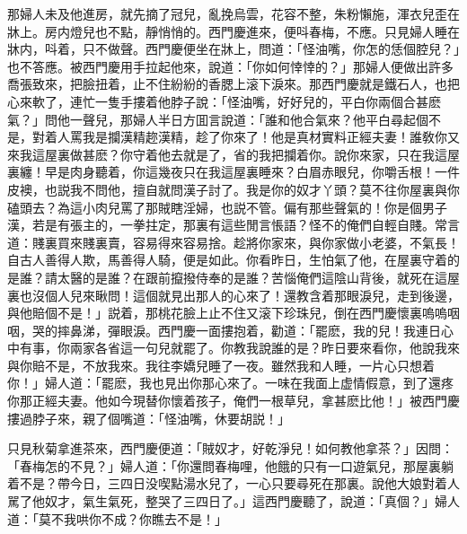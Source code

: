 那婦人未及他進房，就先摘了冠兒，亂挽烏雲，花容不整，朱粉懶施，渾衣兒歪在牀上。房内燈兒也不點，靜悄悄的。西門慶進來，便呌春梅，不應。只見婦人睡在牀内，呌着，只不做聲。西門慶便坐在牀上，問道：「怪油嘴，你怎的恁個腔兒？」也不答應。被西門慶用手拉起他來，說道：「你如何悻悻的？」那婦人便做出許多喬張致來，把臉扭着，止不住紛紛的香腮上滚下淚來。那西門慶就是鐵石人，也把心來軟了，連忙一隻手摟着他脖子說：「怪油嘴，好好兒的，平白你兩個合甚麽氣？」問他一聲兒，那婦人半日方囬言說道：「誰和他合氣來？他平白尋起個不是，對着人罵我是攔漢精趂漢精，趁了你來了！他是真材實料正經夫妻！誰敎你又來我這屋裏做甚麽？你守着他去就是了，省的我把攔着你。說你來家，只在我這屋裏纏！早是肉身聽着，你這幾夜只在我這屋裏睡來？白眉赤眼兒，你嚼舌根！一件皮襖，也説我不問他，擅自就問漢子討了。我是你的奴才丫頭？莫不往你屋裏與你磕頭去？為這小肉兒罵了那賊瞎淫婦，也説不管。偏有那些聲氣的！你是個男子漢，若是有張主的，一拳拄定，那裏有這些閒言悵語？怪不的俺們自輕自賤。常言道：賤裏買來賤裏賣，容易得來容易捨。趁將你家來，與你家做小老婆，不氣長！自古人善得人欺，馬善得人騎，便是如此。你看昨日，生怕氣了他，在屋裏守着的是誰？請太醫的是誰？在跟前攛撥侍奉的是誰？苦惱俺們這陰山背後，就死在這屋裏也沒個人兒來瞅問！這個就見出那人的心來了！還教含着那眼淚兒，走到後邊，與他賠個不是！」説着，那桃花臉上止不住又滚下珍珠兒，倒在西門慶懷裏嗚嗚咽咽，哭的摔鼻涕，彈眼淚。西門慶一面摟抱着，勸道：「罷麽，我的兒！我連日心中有事，你兩家各省這一句兒就罷了。你教我說誰的是？昨日要來看你，他說我來與你賠不是，不放我來。我往李嬌兒睡了一夜。雖然我和人睡，一片心只想着你！」婦人道：「罷麽，我也見出你那心來了。一味在我面上虚情假意，到了還疼你那正經夫妻。他如今現替你懷着孩子，俺們一根草兒，拿甚麽比他！」被西門慶摟過脖子來，親了個嘴道：「怪油嘴，休要胡説！」

只見秋菊拿進茶來，西門慶便道：「賊奴才，好乾淨兒！如何教他拿茶？」因問：「春梅怎的不見？」婦人道：「你還問春梅哩，他餓的只有一口遊氣兒，那屋裏躺着不是？帶今日，三四日没喫點湯水兒了，一心只要尋死在那裏。說他大娘對着人駡了他奴才，氣生氣死，整哭了三四日了。」這西門慶聽了，說道：「真個？」婦人道：「莫不我哄你不成？你瞧去不是！」

